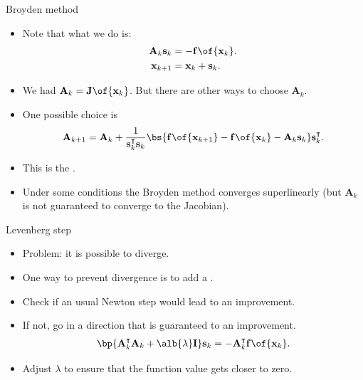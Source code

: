 \documentclass[11pt,xcolor={dvipsnames},aspectratio=159,hyperref={pdftex,pdfpagemode=UseNone,hidelinks,pdfdisplaydoctitle=true},usepdftitle=false]{beamer}
\begin{document}
\begin{frame}{Broyden method}
    
    \begin{itemize} 
    \item Note that what we do is: \begin{align*}
        \mathbf{A}_k \mathbf{s}_k & = -\mathbf{f}\of{\mathbf{x}_k}. \\
        \mathbf{x}_{k+1}  & = \mathbf{x}_k + \mathbf{s}_k. 
    \end{align*}
\item We had $\mathbf{A}_k = \mathbf{J}\of{\mathbf{x}_k}$. But there are other ways to choose $\mathbf{A}_k$.
\item One possible choice is \begin{align*}
    \mathbf{A}_{k+1} = \mathbf{A}_k + \frac{1}{\mathbf{s}_k^\intercal \mathbf{s}_k}\bs{\mathbf{f}\of{\mathbf{x}_{k+1}} - \mathbf{f}\of{\mathbf{x}_{k}} - \mathbf{A}_k \mathbf{s}_k }\mathbf{s}^\intercal_k. \end{align*}
\item This is the .
\item Under some conditions the Broyden method converges superlinearly (but $\mathbf{A}_k$ is not guaranteed to converge to the Jacobian).
\end{itemize}
\end{frame}

\begin{frame}{Levenberg step}
    
    \begin{itemize} 
\item Problem: it is possible to diverge.
\item One way to prevent divergence is to add a .
\item Check if an usual Newton step would lead to an improvement.
\item If not, go in a direction that is guaranteed to an improvement.
\begin{align*}
\bp{\mathbf{A}^\intercal_k \mathbf{A}_k + \alb{\lambda} \mathbf{I}} \mathbf{s}_k = -\mathbf{A}^\intercal_k \mathbf{f}\of{\mathbf{x}_k}.
\end{align*}
\item Adjust $\lambda$ to ensure that the function value gets closer to zero.
    \end{itemize}
\end{frame}


    
\end{document}
